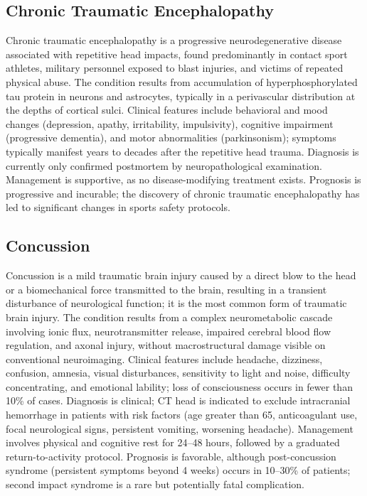 \label{sec:Traumatic Brain Injury}

\subsection{Chronic Traumatic Encephalopathy}
\label{sec:Chronic Traumatic Encephalopathy}
Chronic traumatic encephalopathy is a progressive neurodegenerative disease associated with repetitive head impacts, found predominantly in contact sport athletes, military personnel exposed to blast injuries, and victims of repeated physical abuse. The condition results from accumulation of hyperphosphorylated tau protein in neurons and astrocytes, typically in a perivascular distribution at the depths of cortical sulci. Clinical features include behavioral and mood changes (depression, apathy, irritability, impulsivity), cognitive impairment (progressive dementia), and motor abnormalities (parkinsonism); symptoms typically manifest years to decades after the repetitive head trauma. Diagnosis is currently only confirmed postmortem by neuropathological examination. Management is supportive, as no disease-modifying treatment exists. Prognosis is progressive and incurable; the discovery of chronic traumatic encephalopathy has led to significant changes in sports safety protocols.

\subsection{Concussion}
\label{sec:Concussion}
Concussion is a mild traumatic brain injury caused by a direct blow to the head or a biomechanical force transmitted to the brain, resulting in a transient disturbance of neurological function; it is the most common form of traumatic brain injury. The condition results from a complex neurometabolic cascade involving ionic flux, neurotransmitter release, impaired cerebral blood flow regulation, and axonal injury, without macrostructural damage visible on conventional neuroimaging. Clinical features include headache, dizziness, confusion, amnesia, visual disturbances, sensitivity to light and noise, difficulty concentrating, and emotional lability; loss of consciousness occurs in fewer than 10\% of cases. Diagnosis is clinical; CT head is indicated to exclude intracranial hemorrhage in patients with risk factors (age greater than 65, anticoagulant use, focal neurological signs, persistent vomiting, worsening headache). Management involves physical and cognitive rest for 24--48 hours, followed by a graduated return-to-activity protocol. Prognosis is favorable, although post-concussion syndrome (persistent symptoms beyond 4 weeks) occurs in 10--30\% of patients; second impact syndrome is a rare but potentially fatal complication.

